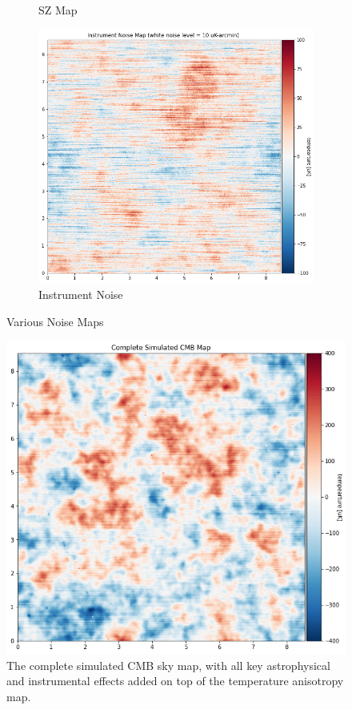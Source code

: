 \documentclass[12pt]{article}
\begin{document}
\begin{figure}[h]
\begin{subfigure}[t]{0.3\textwidth}
         \caption{SZ Map}
         \label{fig:sz_map}
     \end{subfigure}
     \hfill
     \begin{subfigure}[t]{0.3\textwidth}
         \centering
         \includegraphics[width=\textwidth]{images/Instrument noise.png}
         \caption{Instrument Noise}
         \label{fig:instrument_noise}
     \end{subfigure}
        \caption{Various Noise Maps}
        \label{fig:my_label}
\end{figure}

\begin{figure}[H]
    \centering
    \includegraphics[width=\textwidth]{images/complete simulated CMB Map.png}
    \caption{The complete simulated CMB sky map, with all key astrophysical and instrumental effects added on top of the temperature anisotropy map.}
    \label{fig:complete_map}
\end{figure}
\end{document}
